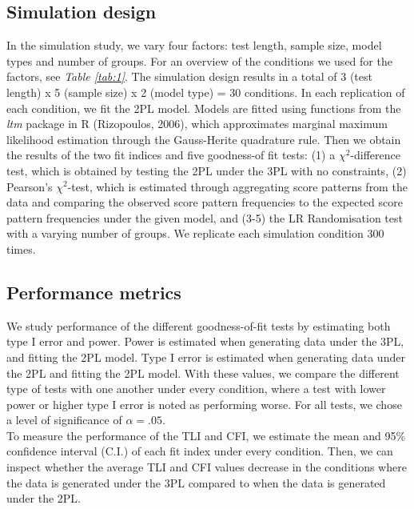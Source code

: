 \documentclass[Royal,sageapa,times,doublespace]{sagej}
\begin{document}
\subsection{Simulation design}
In the simulation study, we vary four factors: test length, sample size, model types and number of groups. For an overview of the conditions we used for the factors, see \textit{Table \ref{tab:1}}. The simulation design results in a total of 3 (test length) x 5 (sample size) x 2 (model type) = 30 conditions. In each replication of each condition, we fit the 2PL model. Models are fitted using functions from the \textit{ltm} package in R (Rizopoulos, 2006), which approximates marginal maximum likelihood estimation through the Gauss-Herite quadrature rule. Then we obtain the results of the two fit indices and five goodness-of fit tests: (1) a $\chi^2$-difference test, which is obtained by testing the 2PL under the 3PL with no constraints, (2) Pearson's $\chi^2$-test, which is estimated through aggregating score patterns from the data and comparing the observed score pattern frequencies to the expected score pattern frequencies under the given model, and (3-5) the LR Randomisation test with a varying number of groups. We replicate each simulation condition 300 times.
\subsection{Performance metrics}
We study performance of the different goodness-of-fit tests by estimating both type I error and power. Power is estimated when generating data under the 3PL, and fitting the 2PL model. Type I error is estimated when generating data under the 2PL and fitting the 2PL model. With these values, we compare the different type of tests with one another under every condition, where a test with lower power or higher type I error is noted as performing worse. For all tests, we chose a level of significance of $\alpha = .05$. \\
\indent To measure the performance of the TLI and CFI, we estimate the mean and 95\% confidence interval (C.I.) of each fit index under every condition. Then, we can inspect whether the average TLI and CFI values decrease in the conditions where the data is generated under the 3PL compared to when the data is generated under the 2PL. 
\end{document}
